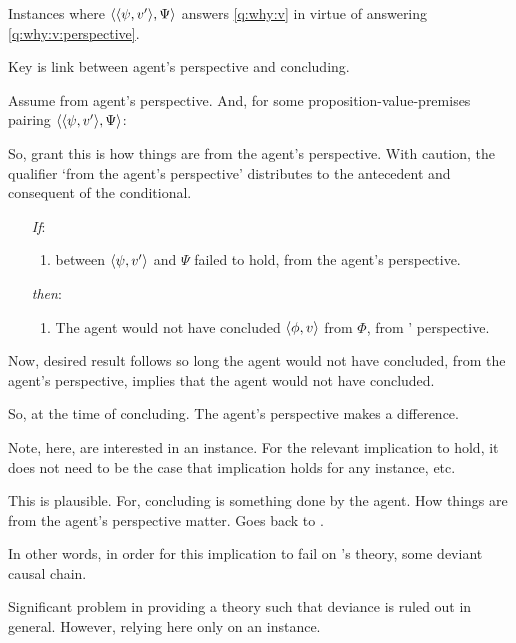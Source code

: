\begin{note}
  \begin{proposition}
    Instances where \(\langle \langle \psi, v' \rangle, \Psi \rangle\) answers \autoref{q:why:v} in virtue of answering \autoref{q:why:v:perspective}.
  \end{proposition}

  Key is link between agent's perspective and concluding.

  Assume from agent's perspective.
  And, for some proposition-value-premises pairing \(\langle \langle \psi, v' \rangle, \Psi \rangle\):

  So, grant this is how things are from the agent's perspective.
  With caution, the qualifier `from the agent's perspective' distributes to the antecedent and consequent of the conditional.

  \begin{enumerate}
  \item[\emph{If}:]
    \begin{enumerate}[label=\alph*., ref=(\alph*)]
    \item
       between \(\langle \psi, v' \rangle\) and \(\Psi\) failed to hold, from the agent's perspective.
    \end{enumerate}
  \item[\emph{then}:]
    \begin{enumerate}[label=\alph*., ref=(\alph*), resume]
    \item
      The agent would not have concluded \(\langle \phi, v \rangle\) from \(\Phi\), from \vAgent{}' perspective.
    \end{enumerate}
  \end{enumerate}

  Now, desired result follows so long the agent would not have concluded, from the agent's perspective, implies that the agent would not have concluded.

  So, at the time of concluding.
  The agent's perspective makes a difference.

  Note, here, are interested in an instance.
  For the relevant implication to hold, it does not need to be the case that implication holds for any instance, etc.

  This is plausible.
  For, concluding is something done by the agent.
  How things are from the agent's perspective matter.
  Goes back to \citeauthor{Davidson:1963aa}.

  In other words, in order for this implication to fail on \citeauthor{Davidson:1963aa}'s theory, some deviant causal chain.

  Significant problem in providing a theory such that deviance is ruled out in general.
  However, relying here only on an instance.
\end{note}

